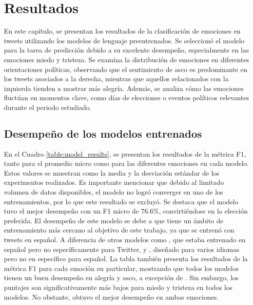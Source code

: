 \chapter{Resultados}

En este capítulo, se presentan los resultados de la clasificación de emociones en tweets utilizando los modelos de lenguaje preentrenados. Se seleccionó el modelo \RT para la tarea de predicción debido a su excelente desempeño, especialmente en las emociones miedo y tristeza. Se examina la distribución de emociones en diferentes orientaciones políticas, observando que el sentimiento de asco es predominante en los tweets asociados a la derecha, mientras que aquellos relacionados con la izquierda tienden a mostrar más alegría. Además, se analiza cómo las emociones fluctúan en momentos clave, como días de elecciones o eventos políticos relevantes durante el periodo estudiado.

\section{Desempeño de los modelos entrenados}

En el Cuadro \ref{table:model_results}, se presentan los resultados de la métrica F1, tanto para el promedio micro como para las diferentes emociones en cada modelo. Estos valores se muestran como la media y la desviación estándar de los experimentos realizados. Es importante mencionar que debido al limitado volumen de datos disponibles, el modelo \BT no logró converger en uno de los entrenamientos, por lo que este resultado se excluyó. Se destaca que el modelo \RT tuvo el mejor desempeño con un F1 micro de 76.6\%, convirtiéndose en la elección preferida. El desempeño de este modelo se debe a que tiene un ámbito de entrenamiento más cercano al objetivo de este trabajo, ya que se entrenó con tweets en español. A diferencia de otros modelos como \BTO, que estaba entrenado en español pero no específicamente para Twitter, y \TXL, diseñado para varios idiomas pero no en específico para español. La tabla también presenta los resultados de la métrica F1 para cada emoción en particular, mostrando que todos los modelos tienen un buen desempeño en alegría y asco, a excepción de \BT. Sin embargo, los puntajes son significativamente más bajos para miedo y tristeza en todos los modelos. No obstante, \RT obtuvo el mejor desempeño en ambas emociones.








